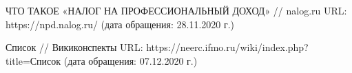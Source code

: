 
\begin{thebibliography}{9} 
	ЧТО ТАКОЕ «НАЛОГ НА ПРОФЕССИОНАЛЬНЫЙ ДОХОД»	
	// nalog.ru
	URL: https://npd.nalog.ru/ 
	(дата обращения: 28.11.2020 г.)
    
    Список
    // Викиконспекты
    URL: https://neerc.ifmo.ru/wiki/index.php?title=Список
    (дата обращения: 07.12.2020 г.)
\end{thebibliography}